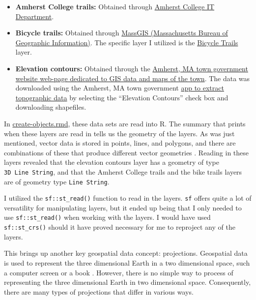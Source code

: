 \documentclass[12pt]{article}
\begin{document}
\begin{itemize}
\item
  \textbf{Amherst College trails:} Obtained through
  \href{https://www.amherst.edu/offices/it}{Amherst College IT
  Department}.
\item
  \textbf{Bicycle trails:} Obtained through
  \href{https://docs.digital.mass.gov/massgis}{MassGIS (Massachusetts
  Bureau of Geographic Information)}. The specific layer I utilized is
  the
  \href{https://docs.digital.mass.gov/dataset/massgis-data-bicycle-trails}{Bicycle
  Trails} layer.
\item
  \textbf{Elevation contours:} Obtained through the
  \href{https://www.amherstma.gov/400/Amherst-Maps-Property-Info}{Amherst,
  MA town government website web-page dedicated to GIS data and maps of
  the town}. The data was downloaded using the Amherst, MA town
  government \href{http://gis.amherstma.gov/apps/topoextract.htm}{app to
  extract topographic data} by selecting the ``Elevation Contours''
  check box and downloading shapefiles.
\end{itemize}

In
\href{https://github.com/Amherst-STAT495F20/STAT495F20-project-Frontero/blob/main/create-objects.Rmd}{create-objects.rmd},
these data sets are read into R. The summary that prints when these
layers are read in tells us the geometry of the layers. As was just
mentioned, vector data is stored in points, lines, and polygons, and
there are combinations of these that produce different vector geometries
\citep{lovelaceGeocomputation2020}. Reading in these layers revealed
that the elevation contours layer has a geometry of type
\texttt{3D\ Line\ String}, and that the Amherst College trails and the
bike trails layers are of geometry type \texttt{Line\ String}.

I utilized the \texttt{sf::st\_read()} function to read in the layers.
\texttt{sf} offers quite a lot of versatility for manipulating layers,
but it ended up being that I only needed to use \texttt{sf::st\_read()}
when working with the layers. I would have used \texttt{sf::st\_crs()}
should it have proved necessary for me to reproject any of the layers.

This brings up another key geospatial data concept: projections.
Geospatial data is used to represent the three dimensional Earth in a
two dimensional space, such a computer screen or a book
\citep{hortonModernDataScience}. However, there is no simple way to
process of representing the three dimensional Earth in two dimensional
space. Consequently, there are many types of projections that differ in
various ways.
\end{document}
